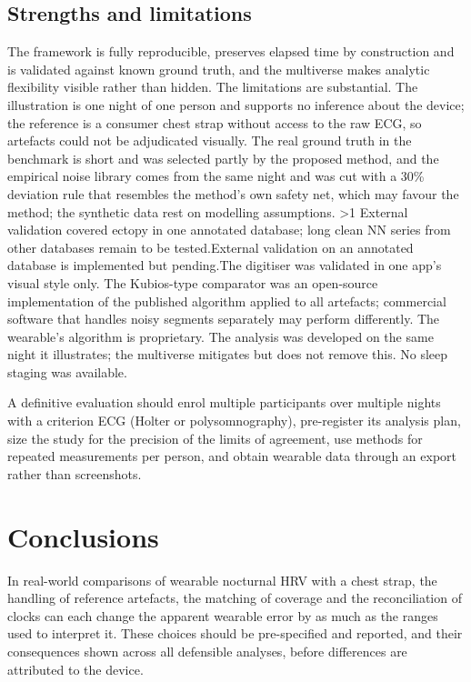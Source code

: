 \documentclass[11pt,a4paper]{article}
\begin{document}
\subsection{Strengths and limitations}
The framework is fully reproducible, preserves elapsed time by construction and is validated against known ground truth, and the multiverse makes analytic flexibility visible rather than hidden. The limitations are substantial. The illustration is one night of one person and supports no inference about the device; the reference is a consumer chest strap without access to the raw ECG, so artefacts could not be adjudicated visually. The real ground truth in the benchmark is short and was selected partly by the proposed method, and the empirical noise library comes from the same night and was cut with a 30\% deviation rule that resembles the method's own safety net, which may favour the method; the synthetic data rest on modelling assumptions. \ifnum\mitRecords>1 External validation covered ectopy in one annotated database; long clean NN series from other databases remain to be tested.\else External validation on an annotated database is implemented but pending.\fi The digitiser was validated in one app's visual style only. The Kubios-type comparator was an open-source implementation of the published algorithm applied to all artefacts; commercial software that handles noisy segments separately may perform differently. The wearable's algorithm is proprietary. The analysis was developed on the same night it illustrates; the multiverse mitigates but does not remove this. No sleep staging was available.

A definitive evaluation should enrol multiple participants over multiple nights with a criterion ECG (Holter or polysomnography), pre-register its analysis plan, size the study for the precision of the limits of agreement,\autocite{bland1986,lu2016} use methods for repeated measurements per person,\autocite{bland2007} and obtain wearable data through an export rather than screenshots.

\section{Conclusions}
In real-world comparisons of wearable nocturnal HRV with a chest strap, the handling of reference artefacts, the matching of coverage and the reconciliation of clocks can each change the apparent wearable error by as much as the ranges used to interpret it. These choices should be pre-specified and reported, and their consequences shown across all defensible analyses, before differences are attributed to the device.
\end{document}

